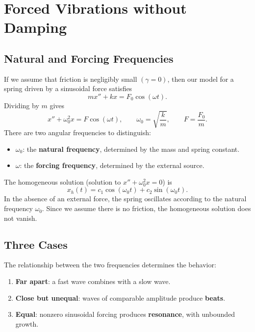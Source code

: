 \documentclass[10pt,letterpaper]{article}
\begin{document}

\section{Forced Vibrations without Damping}

\subsection{Natural and Forcing Frequencies}

If we assume that friction is negligibly small $(\gamma=0)$, then our model for a spring driven by a sinusoidal force satisfies
\[
mx''+kx=F_0\cos(\omega t).
\]
Dividing by $m$ gives
\[
x''+\omega_0^2x=F\cos(\omega t),
\qquad
\omega_0=\sqrt{\frac{k}{m}},
\qquad
F=\frac{F_0}{m}.
\]
There are two angular frequencies to distinguish:
\begin{itemize}
    \item $\omega_0$: the \textbf{natural frequency},
    determined by the mass and spring constant.
    \item $\omega$: the \textbf{forcing frequency},
    determined by the external source.
\end{itemize}
The homogeneous solution (solution to $x''+\omega_0^2x=0$) is
\[
x_h(t)=c_1\cos(\omega_0t)+c_2\sin(\omega_0t).
\]
In the absence of an external force, the spring oscillates according to the natural frequency $\omega_0$. Since we assume there is no friction, the homogeneous solution does not vanish.

\subsection{Three Cases}

The relationship between the two frequencies determines
the behavior:
\begin{enumerate}
    \item \textbf{Far apart}: a fast wave combines with
    a slow wave.
    \item \textbf{Close but unequal}: waves of comparable
    amplitude produce \textbf{beats}.
    \item \textbf{Equal}: nonzero sinusoidal forcing
    produces \textbf{resonance}, with unbounded growth.
\end{enumerate}

\end{document}
